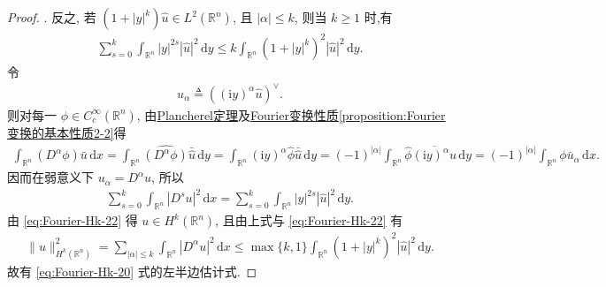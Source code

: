 \documentclass[../../main.tex]{subfiles}
\begin{document}
\begin{proof}
{. } 反之, 若 $(1+|y|^k)\hat{u}\in L^2(\mathbb{R}^n)$, 且 $|\alpha|\leqslant k$, 则当 $k\geqslant 1$ 时,有
\begin{align}\label{eq:Fourier-Hk-22}
\sum_{s=0}^k\int_{\mathbb{R}^n}|y|^{2s}|\hat{u}|^2\,\mathrm{d}y
\leqslant k\int_{\mathbb{R}^n}(1+|y|^k)^2|\hat{u}|^2\,\mathrm{d}y.
\end{align}
令
\begin{align*}
u_\alpha\triangleq ((\text{i}y)^\alpha\hat{u})^\vee.
\end{align*}
则对每一 $\phi\in C_c^\infty(\mathbb{R}^n)$, 由\hyperref[theorem:Plancherel定理]{Plancherel定理}及\hyperref[proposition:Fourier 变换的基本性质2]{Fourier变换性质\ref{proposition:Fourier 变换的基本性质2-2}}得
\begin{align*}
\int_{\mathbb{R}^n}(D^\alpha\phi)\bar{u}\,\mathrm{d}x
=\int_{\mathbb{R}^n}\widehat{(D^\alpha\phi)}\bar{\hat{u}}\,\mathrm{d}y
=\int_{\mathbb{R}^n}(\text{i}y)^\alpha\hat{\phi}\bar{\hat{u}}\,\mathrm{d}y
=(-1)^{|\alpha|}\int_{\mathbb{R}^n}\hat{\phi}\overline{(\text{i}y)^\alpha\hat{u}}\,\mathrm{d}y
=(-1)^{|\alpha|}\int_{\mathbb{R}^n}\phi\bar{u}_\alpha\,\mathrm{d}x.
\end{align*}
因而在弱意义下 $u_\alpha=D^\alpha u$, 所以
\begin{align*}
\sum_{s=0}^k\int_{\mathbb{R}^n}|D^su|^2\,\mathrm{d}x
=\sum_{s=0}^k\int_{\mathbb{R}^n}|y|^{2s}|\hat{u}|^2\,\mathrm{d}y.
\end{align*}
由 \eqref{eq:Fourier-Hk-22} 得 $u\in H^k(\mathbb{R}^n)$, 且由上式与 \eqref{eq:Fourier-Hk-22} 有
\begin{align*}
\|u\|_{H^k(\mathbb{R}^n)}^2
=\sum_{|\alpha|\leqslant k}\int_{\mathbb{R}^n}|D^\alpha u|^2\,\mathrm{d}x
\leqslant \max\{k,1\}\int_{\mathbb{R}^n}(1+|y|^k)^2|\hat{u}|^2\,\mathrm{d}y.
\end{align*}
故有 \eqref{eq:Fourier-Hk-20} 式的左半边估计式. 
\end{proof}
\end{document}
